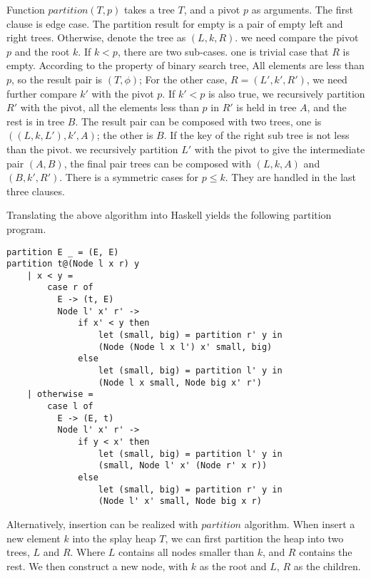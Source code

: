 \documentclass[UTF8]{article}
\begin{document}
Function $partition(T, p)$ takes a tree $T$, and a pivot $p$ as arguments.
The first clause is edge case. The partition result for empty is
a pair of empty left and right trees. Otherwise, denote the tree
as $(L, k, R)$. we need compare the pivot $p$ and the root $k$.
If $k < p$, there are two sub-cases. one is trivial case that
$R$ is empty. According to the property of binary search tree,
All elements are less than $p$, so the result pair is $(T, \phi)$;
For the other case, $R = (L', k', R')$, we need further compare
$k'$ with the pivot $p$. If $k' < p$ is also true, we recursively
partition $R'$ with the pivot, all the elements less than $p$ in
$R'$ is held in tree $A$, and the rest is in tree $B$. The
result pair can be composed with two trees, one is $((L, k, L'), k', A)$;
the other is $B$. If the key of the right sub tree is not less than
the pivot. we recursively partition $L'$ with the pivot to give
the intermediate pair $(A, B)$, the final pair trees can be
composed with $(L, k, A)$ and $(B, k', R')$. There is a symmetric
cases for $p \leq k$. They are handled in the last three clauses.

Translating the above algorithm into Haskell yields the following partition
program.

\begin{lstlisting}
partition E _ = (E, E)
partition t@(Node l x r) y
    | x < y =
        case r of
          E -> (t, E)
          Node l' x' r' ->
              if x' < y then
                  let (small, big) = partition r' y in
                  (Node (Node l x l') x' small, big)
              else
                  let (small, big) = partition l' y in
                  (Node l x small, Node big x' r')
    | otherwise =
        case l of
          E -> (E, t)
          Node l' x' r' ->
              if y < x' then
                  let (small, big) = partition l' y in
                  (small, Node l' x' (Node r' x r))
              else
                  let (small, big) = partition r' y in
                  (Node l' x' small, Node big x r)
\end{lstlisting}

Alternatively, insertion can be realized with $partition$ algorithm.
When insert a new element $k$ into
the splay heap $T$, we can first partition the heap into two trees, $L$ and $R$. Where
$L$ contains all nodes smaller than $k$, and $R$ contains the rest.
We then construct a new node, with $k$ as the root and $L$, $R$ as the children.
\end{document}
